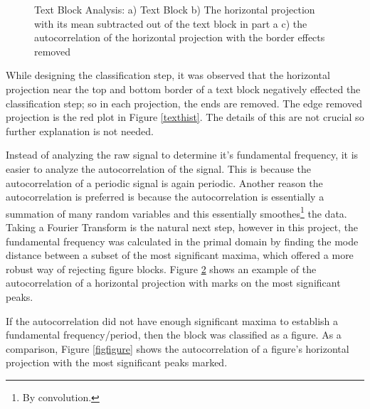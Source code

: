 \documentclass{report}
\begin{document}
\begin{figure}
\begin{subfigure}{.33\columnwidth}
\label{textauto}
\end{subfigure}
\caption{Text Block Analysis: a) Text Block b) The horizontal projection with its mean subtracted out of the text block in part a c) the autocorrelation of the horizontal projection with the border effects removed}
\end{figure}

While designing the classification step, it was observed that the horizontal projection near the top and bottom border of a text block negatively effected the classification step; so in each projection, the ends are removed. The edge removed projection is the red plot in Figure \ref{texthist}. The details of this are not crucial so further explanation is not needed.


Instead of analyzing the raw signal to determine it's fundamental frequency, it is easier to analyze the autocorrelation of the signal. This is because the autocorrelation of a periodic signal is again periodic. Another reason the autocorrelation is preferred is because the autocorrelation is essentially a summation of many random variables and this essentially smoothes\footnote{By convolution.} the data. Taking a Fourier Transform is the natural next step, however in this project, the fundamental frequency was calculated in the primal domain by finding the mode distance between a subset of the most significant maxima, which offered a more robust way of rejecting figure blocks. Figure \ref{textauto} shows an example of the autocorrelation of a horizontal projection with marks on the most significant peaks.


If the autocorrelation did not have enough significant maxima to establish a fundamental frequency/period, then the block was classified as a figure. As a comparison, Figure \ref{figfigure} shows the autocorrelation of a figure's horizontal projection with the most significant peaks marked.
\end{document}
